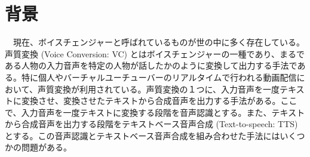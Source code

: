 \section{背景}
\par　現在、ボイスチェンジャーと呼ばれているものが世の中に多く存在している。声質変換 (Voice Conversion: VC) とはボイスチェンジャーの一種であり、まるである人物の入力音声を特定の人物が話したかのように変換して出力する手法である。特に個人やバーチャルユーチューバーのリアルタイムで行われる動画配信において、声質変換が利用されている。声質変換の１つに、入力音声を一度テキストに変換させ、変換させたテキストから合成音声を出力する手法がある。ここで、入力音声を一度テキストに変換する段階を音声認識とする。また、テキストから合成音声を出力する段階をテキストベース音声合成 (Text-to-speech: TTS) とする。この音声認識とテキストベース音声合成を組み合わせた手法にはいくつかの問題がある。
\bunseki{}

